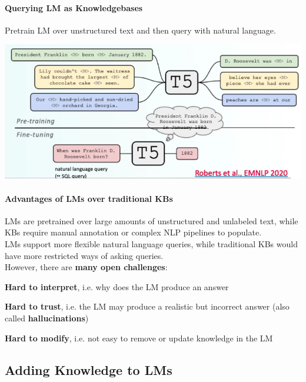 \documentclass[10pt]{report}
\begin{document}
\paragraph{Querying LM as Knowledgebases} Pretrain LM over unstructured  text and then query with natural language.
\begin{center}
	\includegraphics[scale=0.5]{105.png}
\end{center}
\paragraph{Advantages of LMs over traditional KBs} LMs are pretrained over large amounts of unstructured and unlabeled text, while KBs require manual annotation or complex NLP pipelines to populate.\\
LMs support more flexible natural language queries, while traditional KBs would have more restricted ways of asking queries.\\
However, there are \textbf{many open challenges}:
\begin{list}{}{}
	\item \textbf{Hard to interpret}, i.e. why does the LM produce an answer
	\item \textbf{Hard to trust}, i.e. the LM may produce a realistic but incorrect answer (also called \textbf{hallucinations})
	\item \textbf{Hard to modify}, i.e. not easy to remove or update knowledge in the LM
\end{list}
\subsection{Adding Knowledge to LMs}
\end{document}

